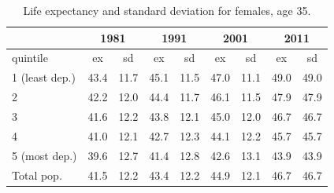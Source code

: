 \documentclass[12pt,oneside,a4paper]{article} %
\theoremstyle{definition}
\begin{document}
\begin{table}[htbp]
  \centering
  \caption{Life expectancy and standard deviation for females, age 35.}
    \begin{tabular}{lrrrrrrrr}
          & \multicolumn{2}{c}{1981} & \multicolumn{2}{c}{1991} & \multicolumn{2}{c}{2001} & \multicolumn{2}{c}{2011} \\
    \midrule
    quintile & \multicolumn{1}{c}{ex} & \multicolumn{1}{c}{sd} & \multicolumn{1}{c}{ex} & \multicolumn{1}{c}{sd} & \multicolumn{1}{c}{ex} & \multicolumn{1}{c}{sd} & \multicolumn{1}{c}{ex} & \multicolumn{1}{c}{sd} \\
    \midrule
    1 (least dep.) & 43.4  & 11.7  & 45.1  & 11.5  & 47.0  & 11.1  & 49.0  & 49.0 \\
    2     & 42.2  & 12.0  & 44.4  & 11.7  & 46.1  & 11.5  & 47.9  & 47.9 \\
    3     & 41.6  & 12.2  & 43.8  & 12.1  & 45.0  & 12.0  & 46.7  & 46.7 \\
    4     & 41.0  & 12.1  & 42.7  & 12.3  & 44.1  & 12.2  & 45.7  & 45.7 \\
    5 (most dep.) & 39.6  & 12.7  & 41.4  & 12.8  & 42.6  & 13.1  & 43.9  & 43.9 \\
    Total pop. & 41.5  & 12.2  & 43.4  & 12.2  & 44.9  & 12.1  & 46.7  & 46.7 \\
    \bottomrule
    \end{tabular}%
  \label{tab:addlabel}%
\end{table}%
\end{document}
